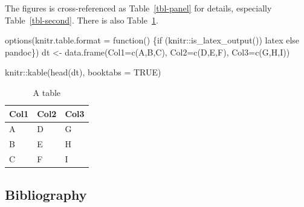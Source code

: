 \documentclass[
  journal,
]{IEEEtran}%
\newenvironment{Shaded}{\begin{snugshade}}{\end{snugshade}}
\newcommand{\AttributeTok}[1]{\textcolor[rgb]{0.40,0.45,0.13}{#1}}
\newcommand{\ConstantTok}[1]{\textcolor[rgb]{0.56,0.35,0.01}{#1}}
\newcommand{\ControlFlowTok}[1]{\textcolor[rgb]{0.00,0.23,0.31}{#1}}
\newcommand{\FunctionTok}[1]{\textcolor[rgb]{0.28,0.35,0.67}{#1}}
\newcommand{\NormalTok}[1]{\textcolor[rgb]{0.00,0.23,0.31}{#1}}
\newcommand{\OtherTok}[1]{\textcolor[rgb]{0.00,0.23,0.31}{#1}}
\newcommand{\SpecialCharTok}[1]{\textcolor[rgb]{0.37,0.37,0.37}{#1}}
\newcommand{\StringTok}[1]{\textcolor[rgb]{0.13,0.47,0.30}{#1}}
\theoremstyle{plain}
\theoremstyle{remark}
\begin{document}
The figures is cross-referenced as Table~\ref{tbl-panel} for details,
especially Table~\ref{tbl-second}. There is also Table~\ref{tbl-other}.

\begin{Shaded}
\begin{Highlighting}[]
\FunctionTok{options}\NormalTok{(}\AttributeTok{knitr.table.format =} \ControlFlowTok{function}\NormalTok{() \{}\ControlFlowTok{if}\NormalTok{ (knitr}\SpecialCharTok{::}\FunctionTok{is\_latex\_output}\NormalTok{()) }\StringTok{\textquotesingle{}latex\textquotesingle{}} \ControlFlowTok{else} \StringTok{\textquotesingle{}pandoc\textquotesingle{}}\NormalTok{\})}
\NormalTok{dt }\OtherTok{\textless{}{-}} \FunctionTok{data.frame}\NormalTok{(}\AttributeTok{Col1=}\FunctionTok{c}\NormalTok{(}\StringTok{\textquotesingle{}A\textquotesingle{}}\NormalTok{,}\StringTok{\textquotesingle{}B\textquotesingle{}}\NormalTok{,}\StringTok{\textquotesingle{}C\textquotesingle{}}\NormalTok{),}
                 \AttributeTok{Col2=}\FunctionTok{c}\NormalTok{(}\StringTok{\textquotesingle{}D\textquotesingle{}}\NormalTok{,}\StringTok{\textquotesingle{}E\textquotesingle{}}\NormalTok{,}\StringTok{\textquotesingle{}F\textquotesingle{}}\NormalTok{),}
                 \AttributeTok{Col3=}\FunctionTok{c}\NormalTok{(}\StringTok{\textquotesingle{}G\textquotesingle{}}\NormalTok{,}\StringTok{\textquotesingle{}H\textquotesingle{}}\NormalTok{,}\StringTok{\textquotesingle{}I\textquotesingle{}}\NormalTok{))}

\NormalTok{knitr}\SpecialCharTok{::}\FunctionTok{kable}\NormalTok{(}\FunctionTok{head}\NormalTok{(dt), }\AttributeTok{booktabs =} \ConstantTok{TRUE}\NormalTok{)}
\end{Highlighting}
\end{Shaded}

\hypertarget{tbl-other}{}
\begin{table}
\caption{\label{tbl-other}A table }\tabularnewline

\centering
\begin{tabular}{lll}
\toprule
Col1 & Col2 & Col3\\
\midrule
A & D & G\\
B & E & H\\
C & F & I\\
\bottomrule
\end{tabular}
\end{table}

\hypertarget{bibliography}{%
\subsection{Bibliography}\label{bibliography}}
\end{document}
